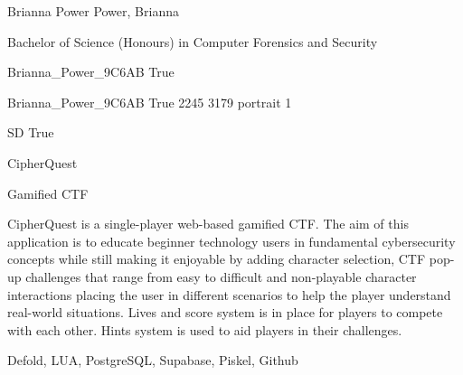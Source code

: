 
\begingroup{}\relax



\def\Key{Brianna_Power_9C6AB}

{Brianna Power}
{Power, Brianna}

{Bachelor of Science (Honours) in Computer Forensics and Security}

{Brianna_Power_9C6AB}
{True}

{Brianna_Power_9C6AB}
{True}
{2245}
{3179}
{portrait}
{1}

{SD}
{True}

{CipherQuest}

{Gamified CTF}

{CipherQuest is a single-player web-based gamified CTF.
The aim of this application is to educate beginner technology users in fundamental cybersecurity concepts while still making it enjoyable by adding character selection, CTF pop-up challenges that range from easy to difficult and non-playable character interactions placing the user in different scenarios to help the player understand real-world situations.
Lives and score system is in place for players to compete with each other. Hints system is used to aid players in their challenges.}

{Defold, LUA, PostgreSQL, Supabase, Piskel, Github}

